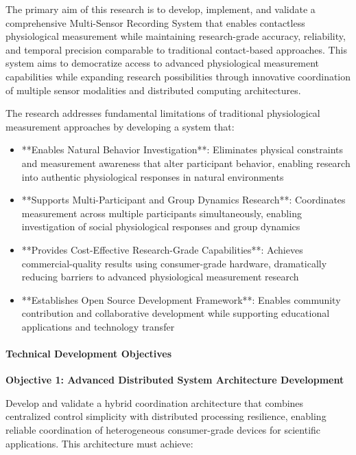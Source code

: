 \documentclass[12pt,a4paper]{report}
\begin{document}
The primary aim of this research is to develop, implement, and validate a comprehensive Multi-Sensor Recording System
that enables contactless physiological measurement while maintaining research-grade accuracy, reliability, and temporal
precision comparable to traditional contact-based approaches. This system aims to democratize access to advanced
physiological measurement capabilities while expanding research possibilities through innovative coordination of
multiple sensor modalities and distributed computing architectures.

The research addresses fundamental limitations of traditional physiological measurement approaches by developing a
system that:

\begin{itemize}
\item **Enables Natural Behavior Investigation**: Eliminates physical constraints and measurement awareness that alter
  participant behavior, enabling research into authentic physiological responses in natural environments
\item **Supports Multi-Participant and Group Dynamics Research**: Coordinates measurement across multiple participants
  simultaneously, enabling investigation of social physiological responses and group dynamics
\item **Provides Cost-Effective Research-Grade Capabilities**: Achieves commercial-quality results using consumer-grade
  hardware, dramatically reducing barriers to advanced physiological measurement research
\item **Establishes Open Source Development Framework**: Enables community contribution and collaborative development while
  supporting educational applications and technology transfer

\end{itemize}
\paragraph{Technical Development Objectives}

\textbf{Objective 1: Advanced Distributed System Architecture Development}

Develop and validate a hybrid coordination architecture that combines centralized control simplicity with distributed
processing resilience, enabling reliable coordination of heterogeneous consumer-grade devices for scientific
applications. This architecture must achieve:
\end{document}
